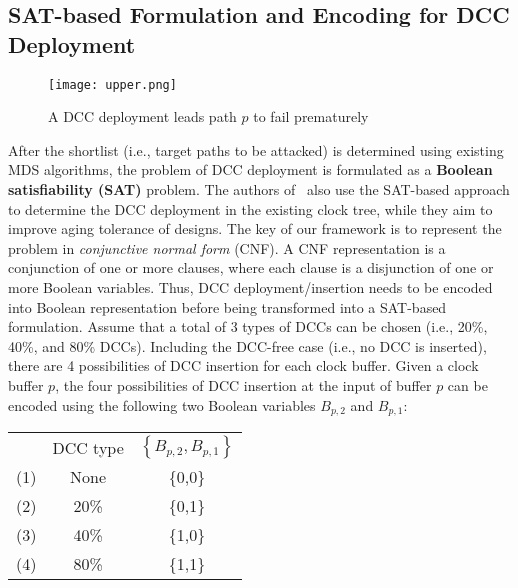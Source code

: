 \subsection{SAT-based Formulation and Encoding for DCC Deployment}
\label{sec:frame:sat}
\begin{comment}
	\begin{figure*}[!ht]
    	\centering
    	\subfigure[A DCC deployment leads path $p$ to fail prematurely]{
    		\label{fig:sub:upper}
        		\texttt{[image: upper.png]}
    	}
   	\hspace{0.1cm}
    	\subfigure[A DCC deployment leads path $p$ to fail post-maturely]{
    		\label{fig:sub:lower}
        		\texttt{[image: lower.png]}
    	}
    	\caption{Illustrative example for the proposed framework based on DCC deployment/insertion}
    	\label{fig:en}
	\end{figure*}
\end{comment}
\begin{figure}
    	\centering
        	\texttt{[image: upper.png]}
       	\caption{A DCC deployment leads path $p$ to fail prematurely}
    	\label{fig:sec:prefail}
\end{figure}
After the shortlist (i.e., target paths to be attacked) is determined using existing MDS algorithms, the problem of DCC deployment is formulated as a \textbf{Boolean satisfiability (SAT)} problem. The authors of~\cite{wu2018maui} also use the SAT-based approach to determine the DCC deployment in the existing clock tree, while they aim to improve aging tolerance of designs. The key of our framework is to represent the problem in \textit{conjunctive normal form} (CNF). A CNF representation is a conjunction of one or more clauses, where each clause is a disjunction of one or more Boolean variables. Thus, DCC deployment/insertion needs to be encoded into Boolean representation before being transformed into a SAT-based formulation. Assume that a total of 3 types of DCCs can be chosen (i.e., 20\%, 40\%, and 80\% DCCs). Including the DCC-free case (i.e., no DCC is inserted), there are 4 possibilities of DCC insertion for each clock buffer. Given a clock buffer $p$, the four possibilities of DCC insertion at the input of buffer $p$ can be encoded using the  following two Boolean variables $B_{p,2}$ and $B_{p,1}$:

{\small
\begin{tabular}{ c c c }
   & DCC type & $\left\{B_{p,2},B_{p,1}\right\}$ \\
  (1)\quad & None & \{0,0\} \\
  (2)\quad & 20\% &  \{0,1\} \\
  (3)\quad & 40\% &  \{1,0\} \\
  (4)\quad & 80\% &  \{1,1\} \\
\end{tabular}}

